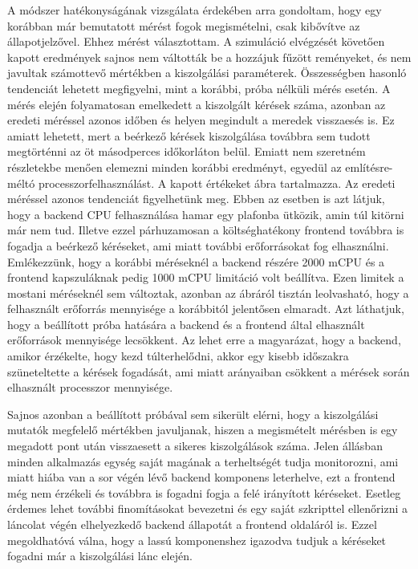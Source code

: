 A módszer hatékonyságának vizsgálata érdekében arra gondoltam, hogy egy korábban már bemutatott mérést fogok megismételni, csak kibővítve az állapotjelzővel.
Ehhez  mérést választottam.
A szimuláció elvégzését követően kapott eredmények sajnos nem váltották be a hozzájuk fűzött reményeket, és nem javultak számottevő mértékben a kiszolgálási paraméterek.
Összességben hasonló tendenciát lehetett megfigyelni, mint a korábbi, próba nélküli mérés esetén. 
A mérés elején folyamatosan emelkedett a kiszolgált kérések száma, azonban az eredeti méréssel azonos időben és helyen megindult a meredek visszaesés is.
Ez amiatt lehetett, mert a beérkező kérések kiszolgálása továbbra sem tudott megtörténni az öt másodperces időkorláton belül.
Emiatt nem szeretném részletekbe menően elemezni minden korábbi eredményt, egyedül az említésre-méltó processzorfelhasználást.
A kapott értékeket  ábra tartalmazza.
Az eredeti méréssel azonos tendenciát figyelhetünk meg. 
Ebben az esetben is azt látjuk, hogy a backend CPU felhasználása hamar egy plafonba ütközik, amin túl kitörni már nem tud.
Illetve ezzel párhuzamosan a költséghatékony frontend továbbra is fogadja a beérkező kéréseket, ami miatt további erőforrásokat fog elhasználni.
Emlékezzünk, hogy a korábbi méréseknél a backend részére 2000 mCPU és a frontend kapszuláknak pedig 1000 mCPU limitáció volt beállítva.
Ezen limitek a mostani méréseknél sem változtak, azonban az ábráról tisztán leolvasható, hogy a felhasznált erőforrás mennyisége a korábbitól jelentősen elmaradt.
Azt láthatjuk, hogy a beállított próba hatására a backend és a frontend által elhasznált erőforrások mennyisége lecsökkent.
Az lehet erre a magyarázat, hogy a backend, amikor érzékelte, hogy kezd túlterhelődni, akkor egy kisebb időszakra szüneteltette a kérések fogadását, ami miatt arányaiban csökkent a mérések során elhasznált processzor mennyisége.

Sajnos azonban a beállított próbával sem sikerült elérni, hogy a kiszolgálási mutatók megfelelő mértékben javuljanak, hiszen a megismételt mérésben is egy megadott pont után visszaesett a sikeres kiszolgálások száma. Jelen állásban minden alkalmazás egység saját magának a terheltségét tudja monitorozni, ami miatt hiába van a sor végén lévő backend komponens leterhelve, ezt a frontend még nem érzékeli és továbbra is fogadni fogja a felé irányított kéréseket.
Esetleg érdemes lehet további finomításokat bevezetni és egy saját szkripttel ellenőrizni a láncolat végén elhelyezkedő backend állapotát a frontend oldaláról is.
Ezzel megoldhatóvá válna, hogy a lassú komponenshez igazodva tudjuk a kéréseket fogadni már a kiszolgálási lánc elején.

